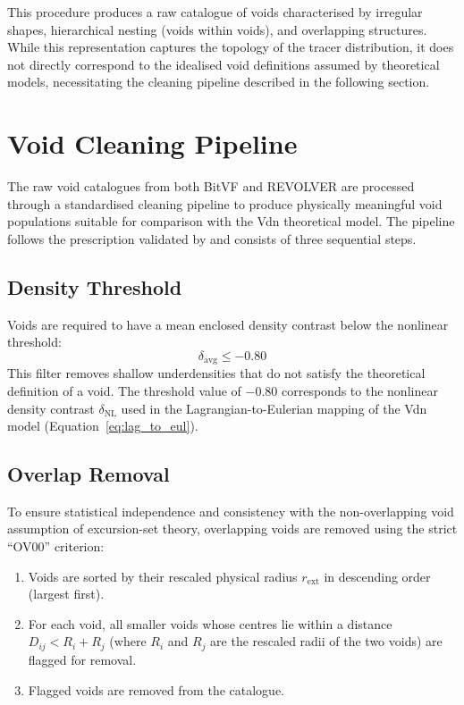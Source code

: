 \documentclass[12pt]{report}
\begin{document}
This procedure produces a raw catalogue of voids characterised by irregular shapes, hierarchical nesting (voids within voids), and overlapping structures. While this representation captures the topology of the tracer distribution, it does not directly correspond to the idealised void definitions assumed by theoretical models, necessitating the cleaning pipeline described in the following section.


\section{Void Cleaning Pipeline}
\label{sec:cleaning}

The raw void catalogues from both BitVF and REVOLVER are processed through a standardised cleaning pipeline to produce physically meaningful void populations suitable for comparison with the Vdn theoretical model. The pipeline follows the prescription validated by \citet{Sartori2025} and consists of three sequential steps.

\subsection{Density Threshold}

Voids are required to have a mean enclosed density contrast below the nonlinear threshold:
\begin{equation}
    \delta_\mathrm{avg} \leq -0.80
    \label{eq:density_threshold}
\end{equation}
This filter removes shallow underdensities that do not satisfy the theoretical definition of a void. The threshold value of $-0.80$ corresponds to the nonlinear density contrast $\delta_\mathrm{NL}$ used in the Lagrangian-to-Eulerian mapping of the Vdn model (Equation~\ref{eq:lag_to_eul}).

\subsection{Overlap Removal}
\label{sec:overlap_criteria}

To ensure statistical independence and consistency with the non-overlapping void assumption of excursion-set theory, overlapping voids are removed using the strict ``OV00'' criterion:

\begin{enumerate}
    \item Voids are sorted by their rescaled physical radius $r_\mathrm{ext}$ in descending order (largest first).
    \item For each void, all smaller voids whose centres lie within a distance $D_{ij} < R_i + R_j$ (where $R_i$ and $R_j$ are the rescaled radii of the two voids) are flagged for removal.
    \item Flagged voids are removed from the catalogue.
\end{enumerate}
\end{document}

